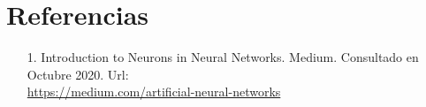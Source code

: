 \documentclass[12pt,a4paper, xcolor=table]{article}
\begin{document}
\clearpage 

\section{Referencias}
    \begin{itemize}
        \item [1.] Introduction to Neurons in Neural Networks. Medium. Consultado en Octubre 2020. Url: \\
        \href{https://medium.com/artificial-neural-networks/introduction-to-neurons-in-neural-networks-71828d040a65}{https://medium.com/artificial-neural-networks}
    \end{itemize}
\printindex
\end{document}
